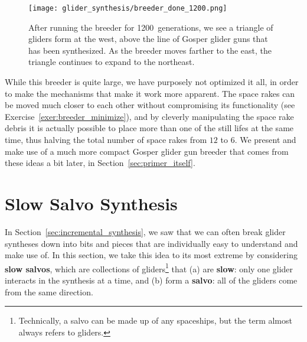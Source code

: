 \begin{figure}[!htb]
	\centering\texttt{[image: glider\_synthesis/breeder\_done\_1200.png]}
	\caption{After running the breeder for 1200~generations, we see a triangle of gliders form at the west, above the line of Gosper glider guns that has been synthesized. As the breeder moves farther to the east, the triangle continues to expand to the northeast.}\label{fig:breeder_done_1200}
\end{figure}

While this breeder is quite large, we have purposely not optimized it all, in order to make the mechanisms that make it work more apparent. The space rakes can be moved much closer to each other without compromising its functionality (see Exercise~\ref{exer:breeder_minimize}), and by cleverly manipulating the space rake debris it is actually possible to place more than one of the still lifes at the same time, thus halving the total number of space rakes from $12$ to $6$. We present and make use of a much more compact Gosper glider gun breeder that comes from these ideas a bit later, in Section~\ref{sec:primer_itself}.



\section{Slow Salvo Synthesis}\label{sec:slow_salvo}

In Section~\ref{sec:incremental_synthesis}, we saw that we can often break glider syntheses down into bits and pieces that are individually easy to understand and make use of. In this section, we take this idea to its most extreme by considering \textbf{slow salvos}, which are collections of gliders\footnote{Technically, a salvo can be made up of any spaceships, but the term almost always refers to gliders.} that (a) are \textbf{slow}: only one glider interacts in the synthesis at a time, and (b) form a \textbf{salvo}: all of the gliders come from the same direction.

